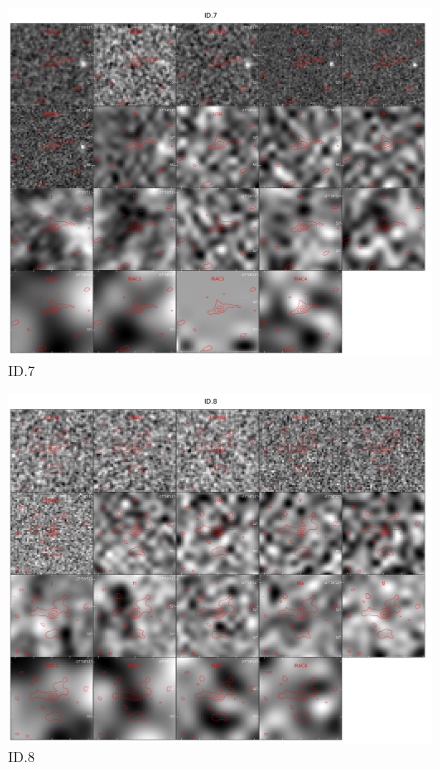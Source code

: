 \begin{figure}[tbp]
\centering \includegraphics[width=160mm]{Matched/ASPECS_Cutout_6.jpg}
\caption{ID.7}
\label{fig:Match_Three}
\end{figure}

\begin{figure}[tbp]
\centering \includegraphics[width=160mm]{Matched/ASPECS_Cutout_7.jpg}
\caption{ID.8}
\label{fig:Match_Three}
\end{figure}


